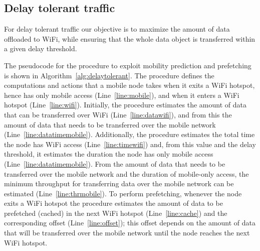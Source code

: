 \documentclass{sig-alternate}
\begin{document}
\subsection{Delay tolerant traffic}

For delay tolerant traffic our objective is to maximize the amount of data offloaded to WiFi, while ensuring that the whole data object is transferred within a given delay threshold.

The pseudocode for the procedure to exploit mobility prediction and prefetching is shown in Algorithm~\ref{alg:delaytolerant}.
The procedure defines the computations and actions that a mobile node takes when it exits a WiFi hotspot, hence has only mobile access (Line~\ref{line:mobile}), and when it enters a WiFi hotspot (Line~\ref{line:wifi}).
Initially, the procedure estimates the amount of data that can be transferred over  WiFi  (Line~\ref{line:datawifi}), and from this the amount of data that needs to be transferred over the mobile network (Line~\ref{line:datatimemobile}). Additionally, the procedure estimates the total time the node has WiFi access (Line~\ref{line:timewifi}) and, from this value and  the delay threshold, it estimates the duration the node has only mobile access (Line~\ref{line:datatimemobile}). From the amount of data that needs to be transferred over the mobile network and the duration of  mobile-only access, the minimum  throughput for transferring data over the mobile network can be estimated (Line~\ref{line:thrmobile}). To perform prefetching,  whenever the node exits a WiFi hotspot the procedure estimates the amount of data to be prefetched (cached) in the next WiFi hotspot (Line~\ref{line:cache}) and the corresponding offset (Line~\ref{line:offset}); this offset depends on the amount of data that will be transferred over the mobile network until the node reaches the next WiFi hotspot.


\newcommand{\swifi}{\mbox{{\scriptsize WiFi}}}
\newcommand{\smobile}{\mbox{{\scriptsize mobile}}}
\newcommand{\sthres}{\mbox{{\scriptsize thres}}}
\newcommand{\smin}{\mbox{{\scriptsize min}}}
\newcommand{\smax}{\mbox{{\scriptsize max}}}
\newcommand{\scache}{\mbox{{\scriptsize cache}}}
\newcommand{\twifi}{\mbox{{\tiny WiFi}}}
\newcommand{\tmobile}{\mbox{{\tiny mobile}}}
\newcommand{\tthres}{\mbox{{\tiny thres}}}
\newcommand{\tmin}{\mbox{{\tiny min}}}
\newcommand{\tmax}{\mbox{{\tiny max}}}
\newcommand{\tcache}{\mbox{{\tiny cache}}}

\newcommand{\tadslno}{\mbox{{\tiny adsl}}}
\newcommand{\tbckhl}{\mbox{{\tiny bckhl}}}
\end{document}
